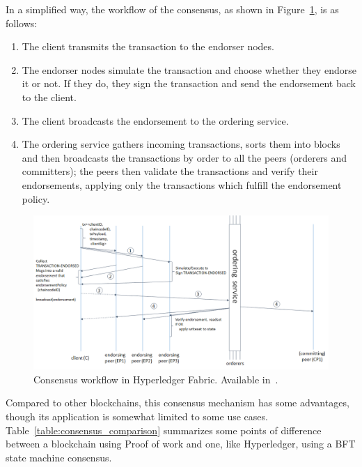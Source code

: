 In a simplified way, the workflow of the consensus, as shown in Figure~\ref{fig:fabric_workflow},  is as follows:
\begin{enumerate}
\item The client transmits the transaction to the endorser nodes.
\item The endorser nodes simulate the transaction and choose whether they endorse it or not. If they do, they sign the transaction and send the endorsement back to the client.
\item The client broadcasts the endorsement to the ordering service.
\item The ordering service gathers incoming transactions, sorts them into blocks and then broadcasts the transactions by order to all the peers (orderers and committers); the peers then validate the transactions and verify their endorsements, applying only the transactions which fulfill the endorsement policy.
\end{enumerate}
\begin{figure}[h]
\centering
\includegraphics[scale=0.5]{media/fabric_workflow.png}
\caption[Consensus workflow in Hyperledger Fabric]{Consensus workflow in Hyperledger Fabric. Available in~\cite{IBMResearch2017}.}
\label{fig:fabric_workflow}
\end{figure}

Compared to other blockchains, this consensus mechanism has some advantages, though its application is somewhat limited to some use cases. Table~\ref{table:consensus_comparison} summarizes some points of difference between a blockchain using Proof of work and one, like Hyperledger, using a BFT state machine consensus.





